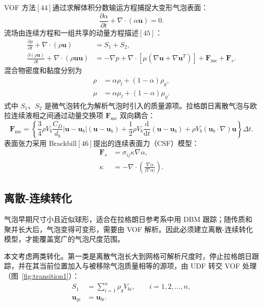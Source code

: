 \documentclass[UTF8,zihao=-4,fontset=fandol]{ctexart}
\newcommand{\vect}[1]{\bm{#1}}
\newcommand{\dd}{\mathrm{d}}
\begin{document}
VOF 方法\([44]\)通过求解体积分数输运方程捕捉大变形气泡表面：
\begin{equation}
\frac{\partial\alpha}{\partial t}+\nabla\cdot(\alpha\vect u)=0. \tag{23}
\end{equation}
流场由连续方程和一组共享的动量方程描述\([45]\)：
\begin{align}
\frac{\partial\rho}{\partial t}+\nabla\cdot(\rho\vect u)&=S_1+S_2, \tag{24}\\
\frac{\partial(\rho\vect u)}{\partial t}+\nabla\cdot(\rho\vect u\vect u)&=
-\nabla p+\nabla\cdot\left[\mu\left(\nabla\vect u+\nabla\vect u^{T}\right)\right]
+\vect F_{\mathrm{me}}+\vect F_s. \tag{25}
\end{align}
混合物密度和黏度分别为
\begin{align}
\rho&=\alpha\rho_l+(1-\alpha)\rho_g, \tag{26}\\
\mu&=\alpha\mu_l+(1-\alpha)\mu_g. \tag{27}
\end{align}
式中 $S_1$、$S_2$ 是微气泡转化为解析气泡时引入的质量源项。拉格朗日离散气泡与欧拉连续液相之间通过动量交换项 $\vect F_{\mathrm{me}}$ 双向耦合：
\begin{equation}
\vect F_{\mathrm{me}}=
\left\{\frac{3}{4}\rho V_b\frac{C_D}{d_b}|\vect u-\vect u_b|(\vect u-\vect u_b)
+\frac{1}{2}\rho V_b\frac{\dd}{\dd t}(\vect u-\vect u_b)
+\rho V_b(\vect u_b\cdot\nabla)\vect u\right\}\Delta t. \tag{28}
\end{equation}
表面张力采用 Brackbill\([46]\)提出的连续表面力（CSF）模型：
\begin{align}
\vect F_s&=\sigma_{ij}\kappa\nabla\alpha, \tag{29}\\
\kappa&=-\nabla\cdot\left(\frac{\nabla\alpha}{|\nabla\alpha|}\right). \tag{30}
\end{align}

\subsection{离散-连续转化}

气泡早期尺寸小且近似球形，适合在拉格朗日参考系中用 DBM 跟踪；随传质和聚并长大后，气泡变得可变形，需要由 VOF 解析。因此必须建立离散-连续转化模型，才能覆盖宽广的气泡尺度范围。

本文考虑两类转化。第一类是离散气泡长大到网格可解析尺度时，停止拉格朗日跟踪，并在其当前位置加入与被移除气泡质量相等的源项，由 UDF 转交 VOF 处理（图~\ref{fig:transition1}）：
\begin{align}
S_1&=\sum_{i=1}^{n}\rho_gV_{bi},\qquad i=1,2,\ldots,n, \tag{31}\\
\vect u_{gi}&=\vect u_{bi}. \tag{32}
\end{align}
\end{document}
